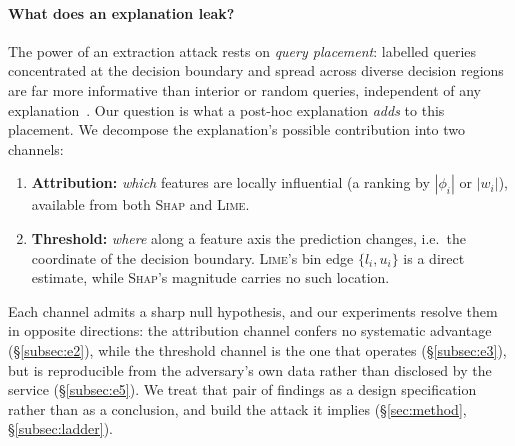 \documentclass[sigconf,anonymous,review]{acmart}
\begin{document}
\paragraph{What does an explanation leak?}
The power of an extraction attack rests on \emph{query placement}: labelled queries
concentrated at the decision boundary and spread across diverse decision regions are far
more informative than interior or random queries, independent of any
explanation~\cite{tramer2016stealing,pal2020activethief}. Our question is what a post-hoc explanation
\emph{adds} to this placement. We decompose the explanation's possible contribution into
two channels:
\begin{enumerate}
  \item \textbf{Attribution:} \emph{which} features are locally influential
  (a ranking by $|\phi_i|$ or $|w_i|$), available from both \textsc{Shap} and
  \textsc{Lime}.
  \item \textbf{Threshold:} \emph{where} along a feature axis the prediction
  changes, i.e.\ the coordinate of the decision boundary. \textsc{Lime}'s bin edge
  $\{l_i, u_i\}$ is a direct estimate, while \textsc{Shap}'s magnitude carries no such
  location.
\end{enumerate}
Each channel admits a sharp null hypothesis, and our experiments resolve them in opposite directions:
the attribution channel confers no systematic advantage (\S\ref{subsec:e2}), while the threshold
channel is the one that
operates (\S\ref{subsec:e3}), but is reproducible from the adversary's own data rather than disclosed
by the service (\S\ref{subsec:e5}). We treat that pair of findings as a design specification rather
than as a conclusion, and build the attack it implies (\S\ref{sec:method}, \S\ref{subsec:ladder}).
\end{document}
